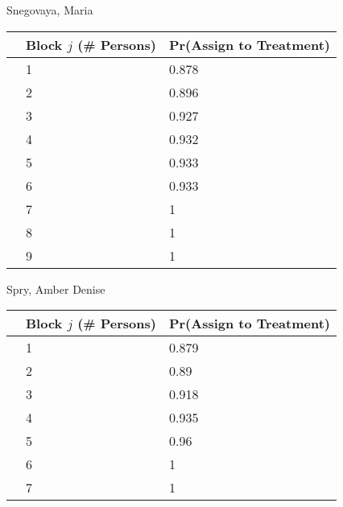 \documentclass[11pt,notitlepage]{article}
\begin{document}
\begin{table}[h!]
\begin{center}
\begin{minipage}[t]{0.45\linewidth}\centering

Snegovaya, Maria

\begin{tabular}{rll}
  \hline
 & Block $j$ (\# Persons) & Pr(Assign to Treatment) \\ 
  \hline
   & 1 & 0.878 \\ 
   & 2 & 0.896 \\ 
   & 3 & 0.927 \\ 
   & 4 & 0.932 \\ 
   & 5 & 0.933 \\ 
   & 6 & 0.933 \\ 
   & 7 & 1 \\ 
   & 8 & 1 \\ 
   & 9 & 1 \\ 
   \hline
\end{tabular}

\end{minipage}
\hspace{0.5cm}
\begin{minipage}[t]{0.45\linewidth}\centering

Spry, Amber Denise

\begin{tabular}{rll}
  \hline
 & Block $j$ (\# Persons) & Pr(Assign to Treatment) \\ 
  \hline
   & 1 & 0.879 \\ 
   & 2 & 0.89 \\ 
   & 3 & 0.918 \\ 
   & 4 & 0.935 \\ 
   & 5 & 0.96 \\ 
   & 6 & 1 \\ 
   & 7 & 1 \\ 
   \hline
\end{tabular}

\end{minipage}
\end{center}
\end{table}
\end{document}
